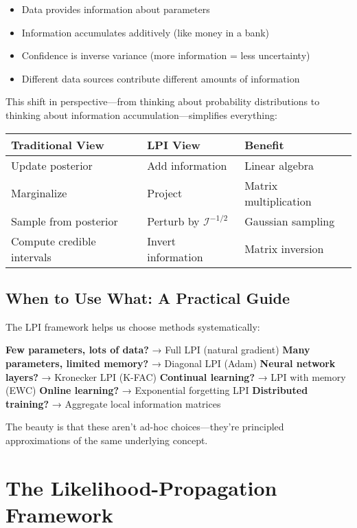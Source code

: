\documentclass[11pt]{article}
\begin{document}
\begin{itemize}
\item Data provides information about parameters
\item Information accumulates additively (like money in a bank)
\item Confidence is inverse variance (more information = less uncertainty)
\item Different data sources contribute different amounts of information
\end{itemize}

This shift in perspective—from thinking about probability distributions to thinking about information accumulation—simplifies everything:

\begin{center}
\begin{tabular}{lll}
\toprule
\textbf{Traditional View} & \textbf{LPI View} & \textbf{Benefit} \\
\midrule
Update posterior & Add information & Linear algebra \\
Marginalize & Project & Matrix multiplication \\
Sample from posterior & Perturb by $\mathcal{I}^{-1/2}$ & Gaussian sampling \\
Compute credible intervals & Invert information & Matrix inversion \\
\bottomrule
\end{tabular}
\end{center}

\subsection{When to Use What: A Practical Guide}

The LPI framework helps us choose methods systematically:

\textbf{Few parameters, lots of data?} → Full LPI (natural gradient)
\textbf{Many parameters, limited memory?} → Diagonal LPI (Adam)
\textbf{Neural network layers?} → Kronecker LPI (K-FAC)
\textbf{Continual learning?} → LPI with memory (EWC)
\textbf{Online learning?} → Exponential forgetting LPI
\textbf{Distributed training?} → Aggregate local information matrices

The beauty is that these aren't ad-hoc choices—they're principled approximations of the same underlying concept.

\section{The Likelihood-Propagation Framework}
\end{document}
